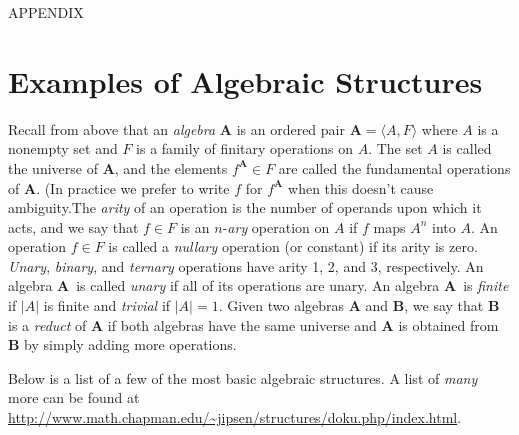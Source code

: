 \documentclass[12pt]{article}
\theoremstyle{plain}
\theoremstyle{definition}
\theoremstyle{remark}
\theoremstyle{remark}
\numberwithin{theorem}{section}
\numberwithin{equation}{section}
\newcommand{\<}{\ensuremath{\langle}}
\renewcommand{\>}{\ensuremath{\rangle}}
\newcommand{\bA}{\ensuremath{\mathbf{A}}}
\newcommand{\bB}{\ensuremath{\mathbf{B}}}
\begin{document}
\appendix                       

\begin{center}
  APPENDIX
\end{center}


\section{Examples of Algebraic Structures}
\label{sec:exampl-algebr-struct}
Recall from above that an \emph{algebra}
$\bA$ is an ordered pair $\bA = \langle A, F\rangle$ 
where $A$ is a nonempty set and $F$ is a family of finitary operations on $A$.
The set $A$ is called the universe of \bA, and the elements $f^{\bA} \in F$ are 
called the fundamental operations of $\bA$. (In practice we prefer to 
write $f$ for $f^{\bA}$ when this doesn't cause
ambiguity.The \emph{arity} of an operation is the number of operands upon which it
acts, and we say that $f\in F$ is an $n$-\emph{ary} operation on
$A$ if $f$ maps $A^n$ into $A$.
An operation $f\in F$ is called a \emph{nullary} operation (or constant) 
if its arity is zero.  \emph{Unary}, \emph{binary}, and \emph{ternary} 
operations have arity 1, 2, and 3, respectively.  An algebra \bA\ is called 
\emph{unary} if all of its operations are unary.  An algebra \bA\ 
is \emph{finite} if $|A|$ is finite and \emph{trivial} if $|A| = 1$.
Given two algebras $\bA$ and $\bB$, we say that $\bB$ is a 
\emph{reduct} of $\bA$ if both algebras have the same universe and $\bA$
is obtained from $\bB$ by simply adding more operations.

Below is a list of a few of the most basic algebraic structures. 
A list of \emph{many} more can be found at
{\small \url{http://www.math.chapman.edu/~jipsen/structures/doku.php/index.html}}.
\end{document}
